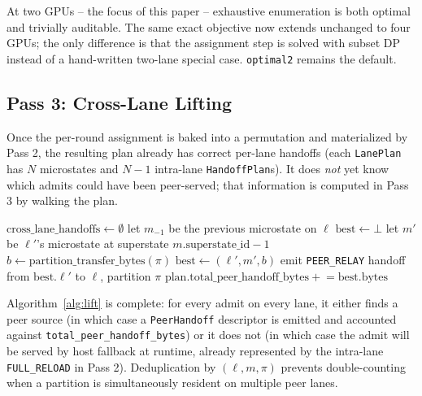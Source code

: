 At two GPUs -- the focus of this paper -- exhaustive enumeration is
both optimal and trivially auditable. The same exact objective now
extends unchanged to four GPUs; the only difference is that the
assignment step is solved with subset DP instead of a hand-written
two-lane special case. \texttt{optimal2} remains the default.

\subsection{Pass 3: Cross-Lane Lifting}\label{sec:compiler:lift}

Once the per-round assignment is baked into a permutation and
materialized by Pass 2, the resulting plan already has correct
per-lane handoffs (each \texttt{LanePlan} has $N$ microstates and $N-1$
intra-lane \texttt{HandoffPlan}s). It does \emph{not} yet know which
admits could have been peer-served; that information is computed in
Pass 3 by walking the plan.

\begin{algorithm}[t]
\caption{Cross-lane lifting (\texttt{populate\_cross\_lane\_handoffs})}
\label{alg:lift}
\begin{algorithmic}[1]
\State $\text{cross\_lane\_handoffs} \gets \emptyset$
  \State let $m_{-1}$ be the previous microstate on $\ell$
    \State $\text{best} \gets \bot$
      \State let $m'$ be $\ell'$'s microstate at superstate $m.\mathrm{superstate\_id}{-}1$
        \State $b \gets \mathrm{partition\_transfer\_bytes}(\pi)$
          \State $\text{best} \gets (\ell', m', b)$
        \EndIf
      \EndIf
    \EndFor
      \State emit \texttt{PEER\_RELAY} handoff from $\text{best}.\ell'$ to $\ell$, partition $\pi$
      \State $\text{plan.total\_peer\_handoff\_bytes} \mathrel{+}= \text{best.bytes}$
    \EndIf
  \EndFor
\EndFor
\end{algorithmic}
\end{algorithm}

Algorithm~\ref{alg:lift} is complete: for every admit on every lane,
it either finds a peer source (in which case a \texttt{PeerHandoff}
descriptor is emitted and accounted against
\texttt{total\_peer\_handoff\_bytes}) or it does not (in which case
the admit will be served by host fallback at runtime, already represented
by the intra-lane \texttt{FULL\_RELOAD} in Pass 2). Deduplication by
$(\ell, m, \pi)$ prevents double-counting when a partition is
simultaneously resident on multiple peer lanes.

